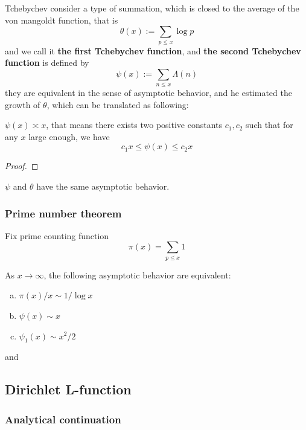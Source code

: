  Tchebychev consider a type of summation, which is closed to the average of the von mangoldt function, that is
 \[\theta(x) := \sum_{p \leq x} \log p\]
 and we call it \textbf{the first Tchebychev function}, and \textbf{the second Tchebychev function} is defined by
\[\psi(x) := \sum_{n \leq x} \Lambda(n)\]
they are equivalent in the sense of asymptotic behavior, and he estimated the growth of \(\theta\), which can be translated as following:

\begin{lemma}[Tchebychev, 1850]
    \(\psi(x) \asymp x\), that means there exists two positive constants \(c_1,c_2\) such that for any \(x\) large enough, we have
    \[c_1 x \leq \psi(x) \leq c_2 x\]
\end{lemma}

\begin{proof}
    
\end{proof}

\begin{corollary}
   \(\psi\) and \(\theta\) have the same asymptotic behavior.
\end{corollary}






\subsubsection{Prime number theorem}

Fix prime counting function
\[\pi(x) = \sum_{p \leq x}1 \]
\begin{colorclaim}
    As \(x \to \infty\), the following asymptotic behavior are equivalent:
    \begin{enumerate} [(a)]
        \item \(\pi(x)/x \sim 1/\log x \) 
        \item \(\psi(x) \sim x\) 
        \item \(\psi_1(x) \sim x^2/2\)
    \end{enumerate}
\end{colorclaim}
and 



\subsection{Dirichlet L-function}

\subsubsection{Analytical continuation}

